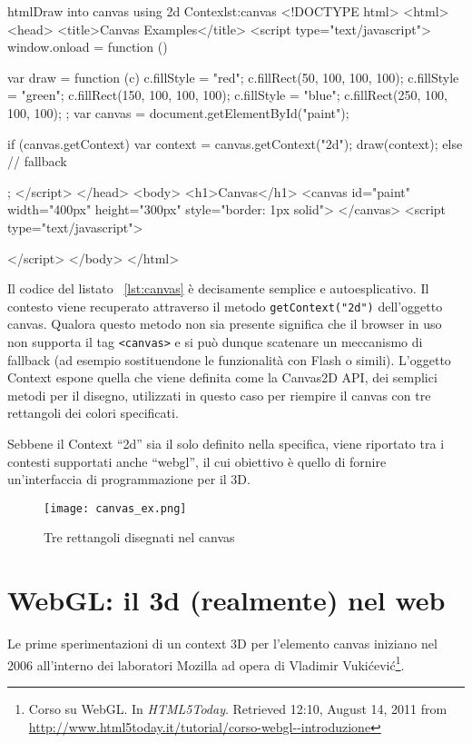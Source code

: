 \begin{mylisting}{html}{Draw into canvas using 2d Contex}{lst:canvas}
<!DOCTYPE html>
<html>
<head>
<title>Canvas Examples</title>
<script type="text/javascript">
window.onload = function () {
    var draw = function (c) {
        c.fillStyle = "red";
        c.fillRect(50, 100, 100, 100);
        c.fillStyle = "green";
        c.fillRect(150, 100, 100, 100);
        c.fillStyle = "blue";
        c.fillRect(250, 100, 100, 100);        
    };
    var canvas = document.getElementById("paint");

    if (canvas.getContext) {
        var context = canvas.getContext("2d");
        draw(context);
    } else {
        // fallback
    }
};    
</script>
</head>
<body>
    <h1>Canvas</h1>
    <canvas id="paint" width="400px" height="300px" style="border: 1px solid"> 
    </canvas>
    <script type="text/javascript">
    
    </script>
</body>
</html>
\end{mylisting}

Il codice del listato ~\ref{lst:canvas} è decisamente semplice e autoesplicativo. Il contesto viene recuperato attraverso il metodo \texttt{getContext("2d")} dell'oggetto canvas. Qualora questo metodo non sia presente significa che il browser in uso non supporta il tag \texttt{<canvas>} e si può dunque scatenare un meccanismo di fallback (ad esempio sostituendone le funzionalità con Flash o simili). L'oggetto Context espone quella che viene definita come la Canvas2D API, dei semplici metodi per il disegno, utilizzati in questo caso per riempire il canvas con tre rettangoli dei colori specificati.

Sebbene il Context ``2d'' sia il solo definito nella specifica, viene riportato tra i contesti supportati anche ``webgl'', il cui obiettivo è quello di fornire un'interfaccia di programmazione per il 3D.

\begin{figure}[Ht]
\centering
\texttt{[image: canvas\_ex.png]}
\caption{Tre rettangoli disegnati nel canvas}
\label{label:canvasex}
\end{figure}
\clearpage

\section{WebGL: il 3d (realmente) nel web}
Le prime sperimentazioni di un context 3D per l'elemento canvas iniziano nel 2006 all'interno dei laboratori Mozilla ad opera di Vladimir Vukićević\footnote{Corso su WebGL. In \textit{HTML5Today}. Retrieved 12:10, August 14, 2011 from \url{http://www.html5today.it/tutorial/corso-webgl--introduzione}}. 

